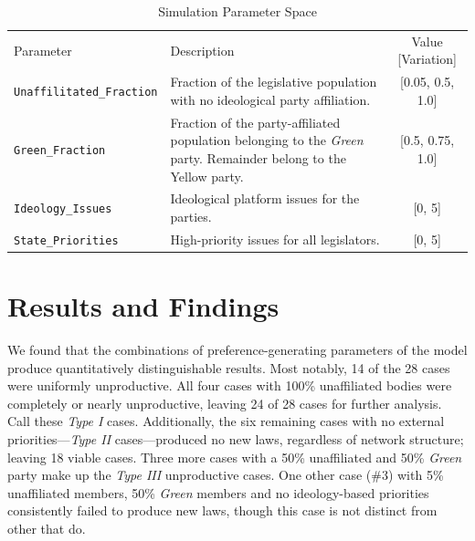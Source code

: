 \documentclass[pdftex,12pt]{llncs}
\begin{document}
\begin{table}
 \caption{Simulation Parameter Space}
 \begin{tabular}{lp{2.25in}c}
 \hline\noalign{\smallskip}
 Parameter & Description & Value [Variation] \\
 \noalign{\smallskip}
 \hline
 \noalign{\smallskip}
 \texttt{Unaffilitated\_Fraction} & Fraction of the legislative population with no ideological party  affiliation. & [0.05, 0.5, 1.0] \\
 \texttt{Green\_Fraction} & Fraction of the party-affiliated population belonging to the \textit{Green} party. Remainder belong to the Yellow party. & [0.5, 0.75, 1.0] \\
 \texttt{Ideology\_Issues} & Ideological platform issues for the parties. & [0, 5] \\
 \texttt{State\_Priorities} & High-priority issues for all legislators. & [0, 5] \\
 \hline
 \end{tabular}
 \label{params}
\end{table}


\section{Results and Findings}
%
We found that the combinations of preference-generating parameters of the model produce quantitatively distinguishable results.
Most notably, 14 of the 28 cases were uniformly unproductive.
All four cases with 100\% unaffiliated bodies were completely or nearly unproductive, leaving 24 of 28 cases for further analysis.
Call these \textit{Type I} cases.
Additionally, the six remaining cases with no external priorities---\textit{Type II} cases---produced no new laws, regardless of network structure; leaving 18 viable cases.
Three more cases with a 50\% unaffiliated and 50\% \textit{Green} party make up the \textit{Type III} unproductive cases.
One other case (\#3) with 5\% unaffiliated members, 50\% \textit{Green} members and no ideology-based priorities consistently failed to produce new laws, though this case is not distinct from other that do. 
\end{document}
